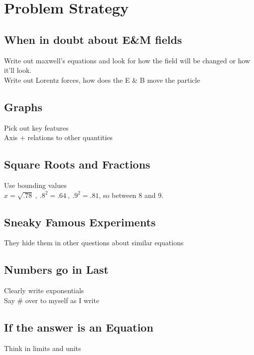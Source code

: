 \documentclass[10pt,letter]{article}
\begin{document}
\section{Problem Strategy} %
\label{sec:problem_strategy}

\subsection{When in doubt about E\&M fields} %
\label{sub:subsection_name}
Write out maxwell's equations and look for how the field will be changed or how it'll look. \\
Write out Lorentz forces, how does the E \& B move the particle 

\subsection{Graphs} %
\label{sub:graphs}
Pick out key features\\
Axis + relations to other quantities

\subsection{Square Roots and Fractions} %
\label{sub:square_roots_and_fractions}
Use bounding values\\
$x = \sqrt{.78}~,~ .8^2 = .64~,~ .9^2 = .81$, so between 8 and 9.

\subsection{Sneaky Famous Experiments} %
\label{sub:snenaky_famous_experiments}
They hide them in other questions about similar equations

\subsection{Numbers go in Last} %
\label{sub:numbers_go_in_last}
Clearly write exponentials\\
Say \# over to myself as I write

\subsection{If the answer is an Equation} %
\label{sub:if_the_answer_is_an_equation}
Think in limits and units
\end{document}

